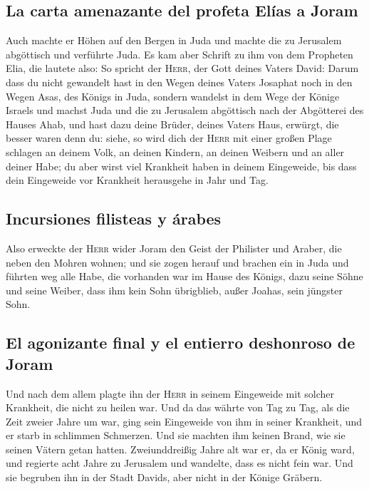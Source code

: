\hypertarget{la-carta-amenazante-del-profeta-eluxedas-a-joram}{%
\subsection{La carta amenazante del profeta Elías a
Joram}\label{la-carta-amenazante-del-profeta-eluxedas-a-joram}}

 Auch machte er Höhen auf den Bergen in Juda und machte
die zu Jerusalem abgöttisch und verführte Juda.  Es kam
aber Schrift zu ihm von dem Propheten Elia, die lautete also: So spricht
der \textsc{Herr}, der Gott deines Vaters David: Darum dass du nicht
gewandelt hast in den Wegen deines Vaters Josaphat noch in den Wegen
Asas, des Königs in Juda,  sondern wandelst in dem Wege
der Könige Israels und machst Juda und die zu Jerusalem abgöttisch nach
der Abgötterei des Hauses Ahab, und hast dazu deine Brüder, deines
Vaters Haus, erwürgt, die besser waren denn du:  siehe,
so wird dich der \textsc{Herr} mit einer großen Plage schlagen an deinem
Volk, an deinen Kindern, an deinen Weibern und an aller deiner Habe;
 du aber wirst viel Krankheit haben in deinem Eingeweide,
bis dass dein Eingeweide vor Krankheit herausgehe in Jahr und Tag.

\hypertarget{incursiones-filisteas-y-uxe1rabes}{%
\subsection{Incursiones filisteas y
árabes}\label{incursiones-filisteas-y-uxe1rabes}}

 Also erweckte der \textsc{Herr} wider Joram den Geist
der Philister und Araber, die neben den Mohren wohnen; 
und sie zogen herauf und brachen ein in Juda und führten weg alle Habe,
die vorhanden war im Hause des Königs, dazu seine Söhne und seine
Weiber, dass ihm kein Sohn übrigblieb, außer Joahas, sein jüngster Sohn.

\hypertarget{el-agonizante-final-y-el-entierro-deshonroso-de-joram}{%
\subsection{El agonizante final y el entierro deshonroso de
Joram}\label{el-agonizante-final-y-el-entierro-deshonroso-de-joram}}

 Und nach dem allem plagte ihn der \textsc{Herr} in
seinem Eingeweide mit solcher Krankheit, die nicht zu heilen war.
 Und da das währte von Tag zu Tag, als die Zeit zweier
Jahre um war, ging sein Eingeweide von ihm in seiner Krankheit, und er
starb in schlimmen Schmerzen. Und sie machten ihm keinen Brand, wie sie
seinen Vätern getan hatten.  Zweiunddreißig Jahre alt war
er, da er König ward, und regierte acht Jahre zu Jerusalem und wandelte,
dass es nicht fein war. Und sie begruben ihn in der Stadt Davids, aber
nicht in der Könige Gräbern.


